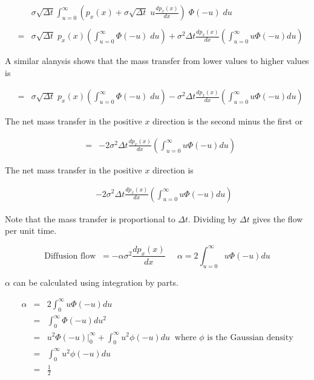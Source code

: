 {
{\Large

\begin{eqnarray*}
&  & \sigma\sqrt{\Delta t} \int_{u = 0}^\infty \left(p_x(x)+\sigma\sqrt{\Delta t}\;u \frac{dp_x(x)}{dx}\right)\;\Phi(-u)\;du \\
\\
& = & \sigma\sqrt{\Delta t}\;p_x(x)\left(\int_{u=0}^\infty \Phi(-u)\;du\right) +  \sigma^2\Delta t \frac{dp_x(x)}{dx} \left(\int_{u=0}^\infty u\Phi(-u) du\right)
\end{eqnarray*}

A similar alanysis shows that the mass transfer from lower values to higher values is

\begin{eqnarray*}
& = & \sigma\sqrt{\Delta t}\;p_x(x)\left(\int_{u=0}^\infty \Phi(-u)\;du\right) -  \sigma^2\Delta t \frac{dp_x(x)}{dx} \left(\int_{u=0}^\infty u\Phi(-u) du\right)
\end{eqnarray*}

\vfill
The net mass transfer in the positive $x$ direction is the second minus the first or

\begin{eqnarray*}
& = & - 2\sigma^2\Delta t \frac{dp_x(x)}{dx} \left(\int_{u=0}^\infty u\Phi(-u) du\right)
\end{eqnarray*}
}

{\Large

The net mass transfer in the positive $x$ direction is

\begin{eqnarray*}
& & - 2\sigma^2\Delta t \frac{dp_x(x)}{dx} \left(\int_{u=0}^\infty u\Phi(-u) du\right)
\end{eqnarray*}

\vfill
Note that the mass transfer is proportional to $\Delta t$.  Dividing by $\Delta t$ gives the flow per unit time.

\vfill
$$\mbox{Diffusion flow}\;\;= - \alpha \sigma^2 \frac{dp_x(x)}{dx}\;\;\;\;\;\alpha = 2\int_{u=0}^\infty u\Phi(-u) du$$

\vfill
$\alpha$ can be calculated using integration by parts.

\begin{eqnarray*}
\alpha & = & 2 \int_{0}^\infty u \Phi(-u)du \\
& = & \int_{0}^\infty \Phi(-u)du^2 \\
& = & u^2 \Phi(-u)|_{0}^{\infty}+\int_{0}^\infty u^2 \phi(-u)du \;\;\mbox{where $\phi$ is the Gaussian density} \\
& = & \int_{0}^\infty u^2 \phi(-u)du\\
& = & \frac{1}{2}
\end{eqnarray*}}

}
